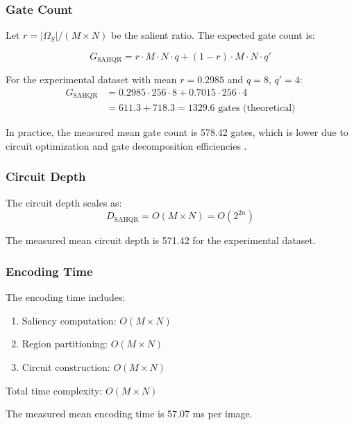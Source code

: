 \documentclass{ipol}
\begin{document}
\subsubsection{Gate Count}

Let $r = |\Omega_S| / (M \times N)$ be the salient ratio. The expected gate count is:

\begin{equation}
G_{\text{SAHQR}} = r \cdot M \cdot N \cdot q + (1-r) \cdot M \cdot N \cdot q'
\label{eq:sahqr_gates}
\end{equation}

For the experimental dataset with mean $r = 0.2985$ and $q = 8$, $q' = 4$:
\begin{align}
G_{\text{SAHQR}} &= 0.2985 \cdot 256 \cdot 8 + 0.7015 \cdot 256 \cdot 4 \\
&= 611.3 + 718.3 = 1329.6 \text{ gates (theoretical)}
\end{align}

In practice, the measured mean gate count is 578.42 gates, which is lower due to circuit optimization and gate decomposition efficiencies \cite{bib68,bib69}.

\subsubsection{Circuit Depth}

The circuit depth scales as:
\begin{equation}
D_{\text{SAHQR}} = O(M \times N) = O(2^{2n})
\label{eq:sahqr_depth}
\end{equation}

The measured mean circuit depth is 571.42 for the experimental dataset.

\subsubsection{Encoding Time}

The encoding time includes:
\begin{enumerate}
\item Saliency computation: $O(M \times N)$
\item Region partitioning: $O(M \times N)$
\item Circuit construction: $O(M \times N)$
\end{enumerate}

Total time complexity: $O(M \times N)$

The measured mean encoding time is 57.07 ms per image.
\end{document}
